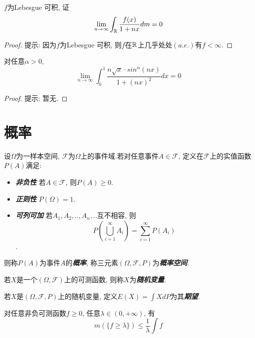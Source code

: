 \documentclass[12pt, a4paper, oneside, UTF8]{ctexbook}  %
\begin{document}
\begin{example}
    $f$为Lebesgue 可积, 证$$\lim_{n\to\infty}\int_{\mathbb{R}}\frac{f(x)}{1+nx}dm=0$$
\end{example}

\begin{proof}
    提示: 因为$f$为Lebesgue 可积, 则$f$在$\mathbb{R}$上几乎处处$(a.e.)$有$f<\infty$.
\end{proof}
\vspace{1cm}

\begin{example}
    对任意$\alpha>0$, $$\lim_{n\to\infty}\int_{0}^{1}\frac{n\sqrt{x}\cdot sin^\alpha(nx)}{1+(nx)^2}dx=0$$
\end{example}

\begin{proof}
    提示: 暂无.
\end{proof}

\newpage
\section{概率}

\begin{defn}
    设$\Omega$为一样本空间, $\mathcal{F}$为$\Omega$上的事件域.若对任意事件$A\in\mathcal{F}$, 定义在$\mathcal{F}$上的实值函数$P(A)$满足:
    \begin{itemize}
        \item \textbf{\emph{非负性}} \quad 若$A\in\mathcal{F}$, 则$P(A)\geq 0$.
        \item \textbf{\emph{正则性}} \quad $P(\Omega)=1$.
        \item \textbf{\emph{可列可加}} \quad 若$A_1, A_2, .. , A_n, .. $互不相容, 则
        $$P(\bigcup_{i=1}^{\infty}A_i)=\sum_{i=1}^{\infty}P(A_i)$$.
    \end{itemize}
    \par 则称$P(A)$为事件$A$的\textbf{\emph{概率}}, 称三元素$(\Omega, \mathcal{F}, P)$为\textbf{\emph{概率空间}}.
\end{defn}

\begin{defn}
    若$X$是一个$(\Omega, \mathcal{F})$上的可测函数, 则称$X$为\textbf{\emph{随机变量}}.
\end{defn}

\begin{defn}
    若$X$是$(\Omega, \mathcal{F}, P)$上的随机变量, 定义$E(X)=\int X dP$为其\textbf{\emph{期望}}.
\end{defn}

\begin{thm}\label{Markov}
    对任意非负可测函数$f\geq 0$, 任意$\lambda\in(0, +\infty)$, 有
    $$ m(\{f\geq\lambda\})\leq \frac{1}{\lambda}\int f $$
\end{thm}
\end{document}
